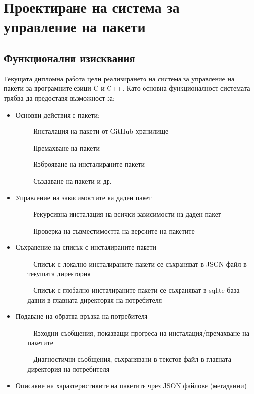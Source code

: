 \chapter{Проектиране на система за управление на пакети}


\section{Функционални изисквания}

Текущата дипломна работа цели реализирането на система за управление на пакети
за програмните езици C и C++. Като основна функционалност системата трябва да
предоставя възможност за:

\begin{itemize}
    \item Основни действия с пакети:
    \begin{itemize}
        \item[--] Инсталация на пакети от GitHub хранилище
        \item[--] Премахване на пакети
        \item[--] Изброяване на инсталираните пакети
        \item[--] Създаване на пакети и др.
    \end{itemize}
    \item Управление на зависимостите на даден пакет
    \begin{itemize}
        \item[--] Рекурсивна инсталация на всички зависимости на даден пакет
        \item[--] Проверка на съвместимостта на версиите на пакетите
    \end{itemize}
    \item Съхранение на списък с инсталираните пакети
    \begin{itemize}
        \item[--] Списък с локално инсталираните пакети се съхраняват в JSON
                  файл в текущата директория
        \item[--] Списък с глобално инсталираните пакети се съхраняват в sqlite
                  база данни в главната директория на потребителя
    \end{itemize}
    \item Подаване на обратна връзка на потребителя
    \begin{itemize}
        \item[--] Изходни съобщения, показващи прогреса на инсталация/премахване
                  на пакетите
        \item[--] Диагностични съобщения, съхранявани в текстов файл в главната
                  директория на потребителя
    \end{itemize}
    \item Описание на характеристиките на пакетите чрез JSON файлове (метаданни)
\end{itemize}



